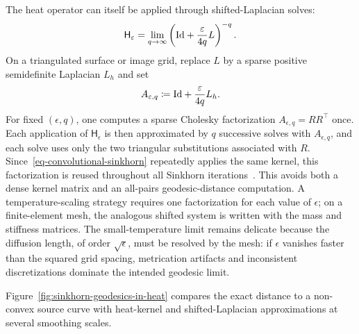 The heat operator can itself be applied through shifted-Laplacian solves:
\[
	\mathsf H_\varepsilon
	=
	\lim_{q\to\infty}
	\left(\mathrm{Id}+\frac{\varepsilon}{4q}L\right)^{-q}.
\]
On a triangulated surface or image grid, replace $L$ by a sparse positive semidefinite Laplacian $L_h$ and set
\[
	A_{\varepsilon,q}\coloneqq \mathrm{Id}+\frac{\varepsilon}{4q}L_h.
\]
For fixed $(\epsilon,q)$, one computes a sparse Cholesky factorization $A_{\epsilon,q}=RR^\top$ once. Each application of $\mathsf H_\epsilon$ is then approximated by $q$ successive solves with $A_{\epsilon,q}$, and each solve uses only the two triangular substitutions associated with $R$. Since~\eqref{eq-convolutional-sinkhorn} repeatedly applies the same kernel, this factorization is reused throughout all Sinkhorn iterations~\cite{2015-solomon-siggraph}. This avoids both a dense kernel matrix and an all-pairs geodesic-distance computation. A temperature-scaling strategy requires one factorization for each value of $\epsilon$; on a finite-element mesh, the analogous shifted system is written with the mass and stiffness matrices. The small-temperature limit remains delicate because the diffusion length, of order $\sqrt\epsilon$, must be resolved by the mesh: if $\epsilon$ vanishes faster than the squared grid spacing, metrication artifacts and inconsistent discretizations dominate the intended geodesic limit.

Figure~\ref{fig:sinkhorn-geodesics-in-heat} compares the exact distance to a non-convex source curve with heat-kernel and shifted-Laplacian approximations at several smoothing scales.

